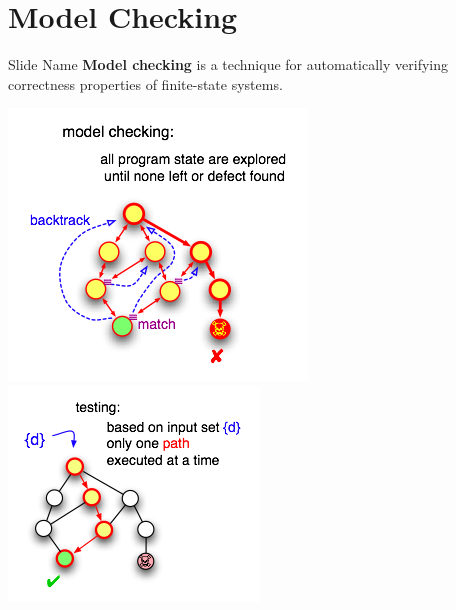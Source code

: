 \documentclass[12pt]{beamer}
\begin{document}
  \section{Model Checking}
  \begin{frame}{Slide Name}
      \textbf{Model checking} is a technique for automatically verifying
      correctness properties of finite-state systems.
      \begin{center}
          \includegraphics[scale=0.5]{figures/states-mc.png}
          \includegraphics[scale=0.6]{figures/states-testing.png}
      \end{center}
  \end{frame}
\end{document}
